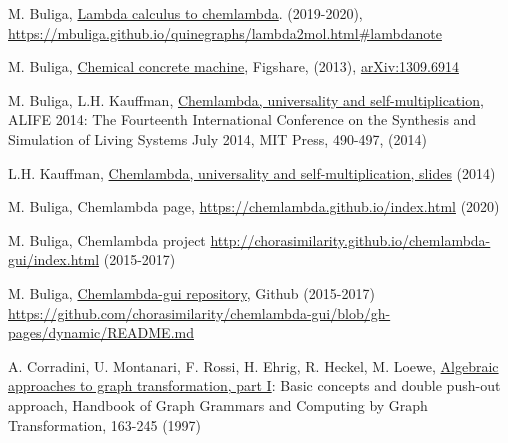 \documentclass{article}
\begin{document}
\begin{thebibliography}{99}
 M. Buliga, \href{https://mbuliga.github.io/quinegraphs/lambda2mol.html#lambdanote}{Lambda calculus to chemlambda}. (2019-2020), \\ \href{https://mbuliga.github.io/quinegraphs/lambda2mol.html#lambdanote}{https://mbuliga.github.io/quinegraphs/lambda2mol.html\#lambdanote}

  M. Buliga,  \href{http://dx.doi.org/10.6084/m9.figshare.830457}{Chemical concrete machine},  Figshare, (2013), \href{https://arxiv.org/abs/1309.6914}{arXiv:1309.6914}

 M. Buliga, L.H. Kauffman,  \href{https://arxiv.org/abs/1403.8046}{Chemlambda, universality and self-multiplication}, ALIFE 2014: The Fourteenth International Conference on the Synthesis and Simulation of Living Systems July 2014, MIT Press, 490-497, (2014) 

 L.H. Kauffman, \href{https://mbuliga.github.io/emergent-10-years/pdf/ALIFETalk-copy.pdf}{Chemlambda, universality and self-multiplication, slides} (2014)


 M. Buliga, Chemlambda page, \href{https://chemlambda.github.io/index.html}{https://chemlambda.github.io/index.html} (2020)

 M. Buliga, Chemlambda project \href{http://chorasimilarity.github.io/chemlambda-gui/index.html}{http://chorasimilarity.github.io/chemlambda-gui/index.html} (2015-2017)

 M. Buliga, \href{https://github.com/chorasimilarity/chemlambda-gui/blob/gh-pages/dynamic/README.md}{Chemlambda-gui repository}, Github (2015-2017)\\ 
\href{https://github.com/chorasimilarity/chemlambda-gui/blob/gh-pages/dynamic/README.md}{https://github.com/chorasimilarity/chemlambda-gui/blob/gh-pages/dynamic/README.md}




 A. Corradini, U. Montanari, F. Rossi, H. Ehrig, R. Heckel, M. Loewe, 
\href{http://eprints.adm.unipi.it/1950/1/TR-96-17.ps.gz}{Algebraic approaches to graph transformation, part I}: Basic concepts and double push-out approach, Handbook of Graph Grammars and Computing by Graph Transformation,  163-245 (1997)


\end{thebibliography}
\end{document}
